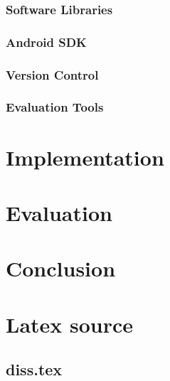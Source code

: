 \documentclass[12pt,twoside,notitlepage]{report}
\begin{document}
\subsection{Software Libraries}

\subsection{Android SDK}

\subsection{Version Control}

\subsection{Evaluation Tools}

\cleardoublepage
\chapter{Implementation}

\label{section:Code_Pseudoinstructions}


\cleardoublepage
\chapter{Evaluation}


\cleardoublepage
\chapter{Conclusion}



\cleardoublepage



\cleardoublepage

\appendix

\chapter{Latex source}

\section{diss.tex}
{\scriptsize}
\end{document}
